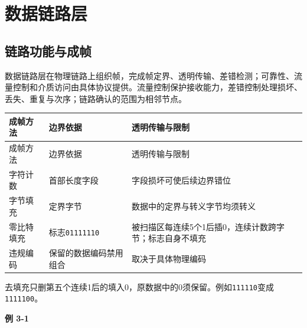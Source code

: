 \chapter{数据链路层}\label{CN03}

\section{链路功能与成帧}\label{CN03-framing}

数据链路层在物理链路上组织帧，完成帧定界、透明传输、差错检测；可靠性、流量控制和介质访问由具体协议提供。流量控制保护接收能力，差错控制处理损坏、丢失、重复与次序；链路确认的范围为相邻节点。

\par\smallskip
\begin{wideblock}
{\fontsize{9.3}{12}\selectfont\setlength{\tabcolsep}{2.5pt}\setlength{\LTleft}{0pt}\setlength{\LTright}{0pt}
\begin{longtable}{@{}>{\raggedright\arraybackslash}p{}>{\raggedright\arraybackslash}p{}>{\raggedright\arraybackslash}p{}@{}}
\toprule
成帧方法 & 边界依据 & 透明传输与限制 \\

\midrule\endfirsthead\toprule
成帧方法 & 边界依据 & 透明传输与限制 \\

\midrule\endhead\bottomrule\endfoot
字符计数 & 首部长度字段 & 字段损坏可使后续边界错位 \\

字节填充 & 定界字节 & 数据中的定界与转义字节均须转义 \\

零比特填充 & 标志\texttt{01111110} & 被扫描区每连续5个1后插0，连续计数跨字节；标志自身不填充 \\

违规编码 & 保留的数据编码禁用组合 & 取决于具体物理编码 \\

\end{longtable}}
\end{wideblock}
\par\smallskip

去填充只删第五个连续1后的填入0，原数据中的0须保留。例如\texttt{111110}变成\texttt{1111100}。

\par\medskip{}\noindent\hypertarget{CN03-E01}{}\label{CN03-E01}\textbf{例 3-1}\par\nobreak\smallskip

